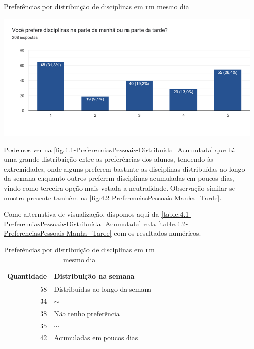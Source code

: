 \begin{MyCenteredFigure}
  \caption{Preferências por distribuição de disciplinas em um mesmo dia}
  \label{fig:4.2-PreferenciasPessoais-Manha_Tarde}
  \includegraphics[width=\textwidth]{files/img/2.02!3-organizacao/2.02!3.1.4-forms/4.2-PreferenciasPessoais-Manha_Tarde}
\end{MyCenteredFigure} %

Podemos ver na \autoref{fig:4.1-PreferenciasPessoais-Distribuida_Acumulada} que há uma grande distribuição entre as preferências dos alunos, tendendo às extremidades, onde alguns preferem bastante as disciplinas distribuídas ao longo da semana enquanto outros preferem disciplinas acumuladas em poucos dias, vindo como terceira opção mais votada a neutralidade. Observação similar se mostra presente também na \autoref{fig:4.2-PreferenciasPessoais-Manha_Tarde}.

Como alternativa de visualização, dispomos aqui da \autoref{table:4.1-PreferenciasPessoais-Distribuída_Acumulada} e da \autoref{table:4.2-PreferenciasPessoais-Manha_Tarde} com os resultados numéricos.

\begin{table}[htbp]\centering
  \caption{Preferências por distribuição de disciplinas em um mesmo dia}
  \label{table:4.1-PreferenciasPessoais-Distribuída_Acumulada}
  \begin{tabular}{| r l |}
    \hline
    \textbf{Quantidade} & \textbf{Distribuição na semana} \\
    \hline
    58                  & Distribuídas ao longo da semana \\
    34                  & $\sim$                          \\
    38                  & Não tenho preferência           \\
    35                  & $\sim$                          \\
    42                  & Acumuladas em poucos dias       \\
    \hline
  \end{tabular}
\end{table}

